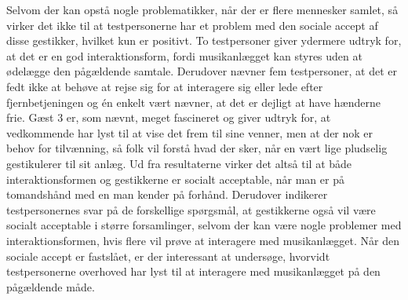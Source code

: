 Selvom der kan opstå nogle problematikker, når der er flere mennesker samlet, så virker det ikke til at testpersonerne har et problem med den sociale accept af disse gestikker, hvilket kun er positivt. To testpersoner giver ydermere udtryk for, at det er en god interaktionsform, fordi musikanlægget kan styres uden at ødelægge den pågældende samtale. Derudover nævner fem testpersoner, at det er fedt ikke at behøve at rejse sig for at interagere sig eller lede efter fjernbetjeningen og én enkelt vært nævner, at det er dejligt at have hænderne frie. Gæst 3 er, som nævnt, meget fascineret og giver udtryk for, at vedkommende har lyst til at vise det frem til sine venner, men at der nok er behov for tilvænning, så folk vil forstå hvad der sker, når en vært lige pludselig gestikulerer til sit anlæg. \blankline
%
Ud fra resultaterne virker det altså til at både interaktionsformen og gestikkerne er socialt acceptable, når man er på tomandshånd med en man kender på forhånd. Derudover indikerer testpersonernes svar på de forskellige spørgsmål, at gestikkerne også vil være socialt acceptable i større forsamlinger, selvom der kan være nogle problemer med interaktionsformen, hvis flere vil prøve at interagere med musikanlægget. Når den sociale accept er fastslået, er der interessant at undersøge, hvorvidt testpersonerne overhoved har lyst til at interagere med musikanlægget på den pågældende måde. 



